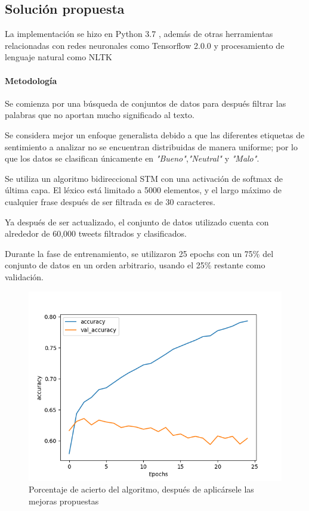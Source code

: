 \documentclass[a4]{sciposter}
\begin{document}
\begin{multicols}{3}
\section{Solución propuesta}
La implementación se hizo en Python 3.7 \citep{python}, además de otras herramientas relacionadas con redes neuronales como Tensorflow 2.0.0 \citep{tensorflow} y procesamiento de lenguaje natural como NLTK \citep{nltk}


\paragraph{Metodología}
Se comienza por una búsqueda de conjuntos de datos para después filtrar las palabras que no aportan mucho significado al texto.

Se considera mejor un enfoque generalista debido a que las diferentes etiquetas de sentimiento a analizar no se encuentran distribuidas de manera uniforme; por lo que los datos se clasifican únicamente en \textit{"Bueno"},\textit{"Neutral"} y \textit{"Malo"}.

Se utiliza un algoritmo bidireccional STM con una activación de softmax de última capa. El léxico está limitado a 5000 elementos, y el largo máximo de cualquier frase después de ser filtrada es de 30 caracteres.

Ya después de ser actualizado, el conjunto de datos utilizado cuenta con alrededor de 60,000 tweets filtrados y clasificados.

Durante la fase de entrenamiento, se utilizaron 25 epochs con un 75\% del conjunto de datos en un orden arbitrario, usando el 25\% restante como validación.

\begin{figure}
	\centering
	\captionsetup{type=figure}
	\setcounter{figure}{1}
	\includegraphics[scale=1.3]{img/Accuracy 2021-07.png}
	\caption{Porcentaje de acierto del algoritmo, después de aplicársele las mejoras propuestas}	
\end{figure}


\end{multicols}
\end{document}

